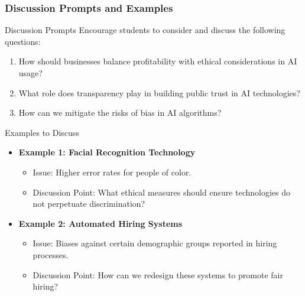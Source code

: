 \documentclass[aspectratio=169]{beamer}
\begin{document}
\begin{frame}[fragile]
    \frametitle{Discussion Prompts and Examples}
    \begin{block}{Discussion Prompts}
        Encourage students to consider and discuss the following questions:
        \begin{enumerate}
            \item How should businesses balance profitability with ethical considerations in AI usage?
            \item What role does transparency play in building public trust in AI technologies?
            \item How can we mitigate the risks of bias in AI algorithms?
        \end{enumerate}
    \end{block}

    \begin{block}{Examples to Discuss}
        \begin{itemize}
            \item \textbf{Example 1: Facial Recognition Technology}
                \begin{itemize}
                    \item Issue: Higher error rates for people of color.
                    \item Discussion Point: What ethical measures should ensure technologies do not perpetuate discrimination?
                \end{itemize}
            
            \item \textbf{Example 2: Automated Hiring Systems}
                \begin{itemize}
                    \item Issue: Biases against certain demographic groups reported in hiring processes.
                    \item Discussion Point: How can we redesign these systems to promote fair hiring?
                \end{itemize}
        \end{itemize}
    \end{block}
\end{frame}
\end{document}
